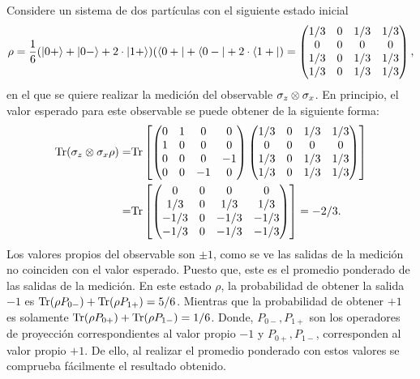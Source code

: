 Considere un sistema de dos partículas con el siguiente estado inicial \[\rho= \dfrac{1}{6}(|0+\rangle+|0-\rangle+2 \cdot|1+\rangle)(\langle0+|+\langle0-|+2 \cdot\langle1+|)=\begin{pmatrix}
    1/3&0&1/3&1/3\\
    0&0&0&0\\
    1/3&0&1/3&1/3\\
    1/3&0&1/3&1/3\\
\end{pmatrix},\] en el que se quiere realizar la medición del observable $\sigma_z\otimes\sigma_x$. En principio, el valor esperado para este observable se puede obtener de la siguiente forma:
\[\begin{split}
    {\rm Tr}(\sigma_z\otimes\sigma_x \rho) =& {\rm Tr}\left[ \begin{pmatrix}
    0&1&0&0\\
    1&0&0&0\\
    0&0&0&-1\\
    0&0&-1&0\\
\end{pmatrix}\begin{pmatrix}
    1/3&0&1/3&1/3\\
    0&0&0&0\\
    1/3&0&1/3&1/3\\
    1/3&0&1/3&1/3\\
\end{pmatrix}\right]\\
=& {\rm Tr}\left[ \begin{pmatrix}
    0&0&0&0\\
    1/3&0&1/3&1/3\\
    -1/3&0&-1/3&-1/3\\
    -1/3&0&-1/3&-1/3\\
\end{pmatrix}\right]=-2/3. \end{split}\] Los valores propios del observable son $\pm 1$, como se ve las salidas de la medición no coinciden con el valor esperado. Puesto que, este es el promedio ponderado de las salidas de la medición.  En este estado $\rho$, la probabilidad de obtener  la salida $-1$ es ${\rm Tr}(\rho P_{0-})+{\rm Tr}(\rho P_{1+})=5/6$. Mientras que la probabilidad de obtener $+1$ es solamente ${\rm Tr}(\rho P_{0+})+{\rm Tr}(\rho P_{1-})=1/6$. Donde, $ P_{0-}, P_{1+}$ son los operadores de proyección correspondientes al valor propio $-1$ y $ P_{0+}, P_{1-}$, corresponden al valor propio $+1$. De ello, al realizar el promedio ponderado con estos valores se comprueba fácilmente el resultado obtenido.

